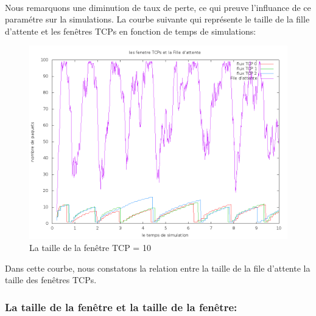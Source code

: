 \documentclass[a4paper]{report}
\theoremstyle{definition}
\begin{document}
\paragraph*{}
   Nous remarquons une diminution de taux de perte, ce qui preuve l'influance de ce paramétre sur la simulations.
   La courbe suivante qui représente le taille de la fille d'attente et les fenêtres TCPs en fonction de temps de simulations:
   \begin{center}
   
  
\begin{figure}[h]
	\centering
		\includegraphics[width=450px]{graphic/f100w10.png}
		\caption{La taille de la fenêtre TCP = 10}
\end{figure}
   \end{center}
   
   Dans cette courbe, nous constatons la relation entre la taille de la file d'attente la taille des fenêtres TCPs.


\subsubsection*{La taille de la fenêtre  et la taille de la fenêtre:}
\end{document}
